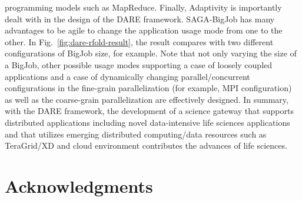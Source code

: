 \documentclass{sig-alternate}
\begin{document}
programming models such as MapReduce.  Finally, Adaptivity is
importantly dealt with in the design of the DARE framework.
SAGA-BigJob has many advantages to be agile to change the application
usage mode from one to the other.  In
Fig.~\ref{fig:dare-rfold-result}, the result compares with two
different configurations of BigJob size, for example.  Note that not
only varying the size of a BigJob, other possible usage modes
supporting a case of loosely coupled applications and a case of
dynamically changing parallel/concurrent configurations in the
fine-grain parallelization (for example, MPI configuration) as well as
the coarse-grain parallelization are effectively designed.
In summary, with the DARE framework, the development of a science gateway that supports distributed applications including novel data-intensive life sciences applications and that utilizes emerging distributed computing/data resources such as TeraGrid/XD and cloud environment contributes the advances of life sciences.    


\section{Acknowledgments}






\end{document}
